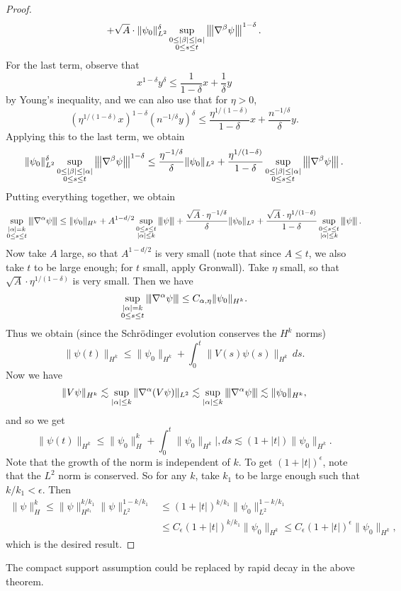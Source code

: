 \begin{proof}
\[    + \sqrt{A} \cdot \|\psi_0\|_{L^2}^\delta \sup_{\substack{0 \le |\beta| \le |\alpha| \\ 0 \le s \le t}} \left\lvert\hspace{-1 pt}\left\lvert\hspace{-1 pt}\left\lvert {\nabla^\beta \psi}\right\lvert\hspace{-1 pt}\right\lvert\hspace{-1 pt}\right\lvert^{1 - \delta}.
  \]
  For the last term, observe that
  \[
    x^{1 - \delta} y^\delta \le \frac{1}{1 - \delta} x + \frac{1}{\delta} y
  \]
  by Young's inequality, and we can also use that
  for $\eta > 0$,
  \[
  \left(\eta^{1 / (1 - \delta)} x\right)^{1 - \delta}
  \left(n^{-1 / \delta} y\right)^\delta
  \le \frac{\eta^{1 / (1 - \delta)}}{1 - \delta} x + 
  \frac{n^{-1 / \delta}}{\delta} y.
  \]
  Applying this to the last term, we obtain
  \[
    \|\psi_0\|_{L^2}^\delta \sup_{\substack{0 \le |\beta| \le |\alpha| \\ 0 \le s \le t}} \left\lvert\hspace{-1 pt}\left\lvert\hspace{-1 pt}\left\lvert {\nabla^\beta \psi}\right\lvert\hspace{-1 pt}\right\lvert\hspace{-1 pt}\right\lvert^{1 - \delta}
    \le \frac{\eta^{-1 / \delta}}{\delta} \|\psi_0\|_{L^2}
    + \frac{\eta^{1 / (1 - \delta)}}{1 - \delta}
    \sup_{\substack{0 \le |\beta| \le |\alpha| \\ 0 \le s \le t}} \left\lvert\hspace{-1 pt}\left\lvert\hspace{-1 pt}\left\lvert {\nabla^\beta \psi}\right\lvert\hspace{-1 pt}\right\lvert\hspace{-1 pt}\right\lvert.
  \]
  Putting everything together, we obtain
  \[
    \sup_{\substack{|\alpha| = k \\ 0 \le s \le t}}
    \left\lvert\hspace{-1 pt}\left\lvert\hspace{-1 pt}\left\lvert {\nabla^\alpha \psi}\right\lvert\hspace{-1 pt}\right\lvert\hspace{-1 pt}\right\lvert
    \le \|\psi_0\|_{H^k} + A^{1 - d / 2} \sup_{\substack{0 \le s \le t \\ |\alpha| \le k}} \left\lvert\hspace{-1 pt}\left\lvert\hspace{-1 pt}\left\lvert {\psi}\right\lvert\hspace{-1 pt}\right\lvert\hspace{-1 pt}\right\lvert
    + \frac{\sqrt{A} \cdot \eta^{-1 / \delta}}{\delta} \|\psi_0\|_{L^2}
    + \frac{\sqrt{A} \cdot \eta^{1 / (1 - \delta)}}{1 - \delta} \sup_{\substack{0 \le s \le t \\ |\alpha| \le k}} \left\lvert\hspace{-1 pt}\left\lvert\hspace{-1 pt}\left\lvert {\psi}\right\lvert\hspace{-1 pt}\right\lvert\hspace{-1 pt}\right\lvert.
  \]
  Now take $A$ large, so that $A^{1 - d / 2}$ is very
  small (note that since $A \le t$, we also take
  $t$ to be large enough; for $t$ small,
  apply Gronwall). Take $\eta$ small, so that $\sqrt{A} \cdot \eta^{1 / (1 - \delta)}$
  is very small. Then we have
  \[
    \sup_{\substack{|\alpha| = k \\ 0 \le s \le t}}
    \left\lvert\hspace{-1 pt}\left\lvert\hspace{-1 pt}\left\lvert {\nabla^\alpha \psi}\right\lvert\hspace{-1 pt}\right\lvert\hspace{-1 pt}\right\lvert
    \le C_{\alpha, \eta} \|\psi_0\|_{H^k}.
  \]
  Thus we obtain (since the Schr\"odinger evolution
  conserves the $H^k$ norms)
  \[
    \|\psi(t)\|_{H^k}
    \le \|\psi_0\|_{H^k} + \int_0^t \|V(s) \psi(s)\|_{H^k}\, ds.
  \]
  Now we have
  \[
    \|V\psi\|_{H^k} \lesssim
    \sup_{|\alpha| \le k} \|\nabla^\alpha (V\psi)\|_{L^2}
    \lesssim \sup_{|\alpha| \le k} \left\lvert\hspace{-1 pt}\left\lvert\hspace{-1 pt}\left\lvert {\nabla^\alpha \psi}\right\lvert\hspace{-1 pt}\right\lvert\hspace{-1 pt}\right\lvert
    \lesssim \|\psi_0\|_{H^k},
  \]
  and so we get
  \[
    \|\psi(t)\|_{H^k}
    \le \|\psi_0\|_H^k + \int_0^t \|\psi_0 \|_{H^k}|, ds
    \lesssim (1 + |t|) \|\psi_0\|_{H^k}.
  \]
  Note that the growth of the norm is independent of
  $k$.
  To get $(1 + |t|)^\epsilon$, note that the
  $L^2$ norm is conserved. So for any $k$, take
  $k_1$ to be large enough such that $k / k_1 < \epsilon$.
  Then
  \begin{align*}
    \|\psi\|_H^k
    \le \|\psi\|^{k / k_1}_{H^{k_1}} \|\psi\|_{L^2}^{1 - k / k_1}
    &\le (1 + |t|)^{k / k_1} \|\psi_0\|_{L^2}^{1 - k / k_1} \\
    &\le C_\epsilon (1 + |t|)^{k / k_1} \|\psi_0\|_{H^k}
    \le C_\epsilon (1 + |t|)^\epsilon \|\psi_0\|_{H^k},
  \end{align*}
  which is the desired result.
\end{proof}

\begin{remark}
  The compact support assumption could be replaced
  by rapid decay in the above theorem.
\end{remark}
